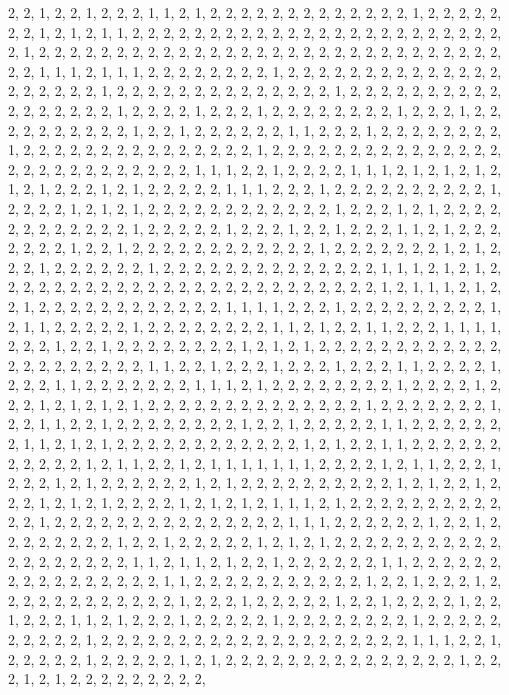 \documentclass[
]{article}
\begin{document}
\begin{Schunk}
\begin{Soutput}
2, 2, 1, 2, 2, 1, 2, 2, 2, 1, 1, 2, 1, 2, 2, 2, 2, 2, 2, 2, 2, 2, 2, 2, 2, 2, 1, 2, 2, 2, 2, 2, 2, 2, 1, 2, 1, 2, 1, 1, 2, 2, 2, 2, 2, 2, 2, 2, 2, 2, 2, 2, 2, 2, 2, 2, 2, 2, 2, 2, 2, 2, 2, 2, 2, 1, 2, 2, 2, 2, 2, 2, 2, 2, 2, 2, 2, 2, 2, 2, 2, 2, 2, 2, 2, 2, 2, 2, 2, 2, 2, 2, 2, 2, 2, 2, 2, 2, 1, 1, 1, 2, 1, 1, 1, 2, 2, 2, 2, 2, 2, 2, 2, 1, 2, 2, 2, 2, 2, 2, 2, 2, 2, 2, 2, 2, 2, 2, 2, 2, 2, 2, 2, 2, 1, 2, 2, 2, 2, 2, 2, 2, 2, 2, 2, 2, 2, 2, 2, 1, 2, 2, 2, 2, 2, 2, 2, 2, 2, 2, 2, 2, 2, 2, 2, 2, 2, 1, 2, 2, 2, 2, 1, 2, 2, 2, 1, 2, 2, 2, 2, 2, 2, 2, 2, 1, 2, 2, 2, 1, 2, 2, 2, 2, 2, 2, 2, 2, 2, 2, 1, 2, 2, 1, 2, 2, 2, 2, 2, 2, 1, 1, 2, 2, 2, 1, 2, 2, 2, 2, 2, 2, 2, 2, 1, 2, 2, 2, 2, 2, 2, 2, 2, 2, 2, 2, 2, 2, 2, 2, 1, 2, 2, 2, 2, 2, 2, 2, 2, 2, 2, 2, 2, 2, 2, 2, 2, 2, 2, 2, 2, 2, 2, 2, 2, 2, 2, 2, 1, 1, 1, 2, 2, 1, 2, 2, 2, 2, 1, 1, 1, 2, 1, 2, 1, 2, 1, 2, 1, 2, 1, 2, 2, 2, 1, 2, 1, 2, 2, 2, 2, 2, 1, 1, 1, 2, 2, 2, 1, 2, 2, 2, 2, 2, 2, 2, 2, 2, 2, 1, 2, 2, 2, 2, 1, 2, 1, 2, 1, 2, 2, 2, 2, 2, 2, 2, 2, 2, 2, 2, 2, 1, 2, 2, 2, 1, 2, 1, 2, 2, 2, 2, 2, 2, 2, 2, 2, 2, 2, 2, 1, 2, 2, 2, 2, 2, 1, 2, 2, 2, 1, 2, 2, 1, 2, 2, 2, 1, 1, 2, 1, 2, 2, 2, 2, 2, 2, 2, 1, 2, 2, 1, 2, 2, 2, 2, 2, 2, 2, 2, 2, 2, 2, 2, 1, 2, 2, 2, 2, 2, 2, 2, 1, 2, 1, 2, 2, 2, 1, 2, 2, 2, 2, 2, 2, 1, 2, 2, 2, 2, 2, 2, 2, 2, 2, 2, 2, 2, 2, 2, 1, 1, 1, 2, 1, 2, 1, 2, 2, 2, 2, 2, 2, 2, 2, 2, 2, 2, 2, 2, 2, 2, 2, 2, 2, 2, 2, 2, 2, 2, 2, 2, 1, 2, 1, 1, 1, 2, 1, 2, 2, 1, 2, 2, 2, 2, 2, 2, 2, 2, 2, 2, 2, 2, 1, 1, 1, 1, 2, 2, 2, 1, 2, 2, 2, 2, 2, 2, 2, 2, 2, 1, 2, 1, 1, 2, 2, 2, 2, 2, 1, 2, 2, 2, 2, 2, 2, 2, 2, 1, 1, 2, 1, 2, 2, 1, 1, 2, 2, 2, 1, 1, 1, 1, 2, 2, 2, 1, 2, 2, 1, 2, 2, 2, 2, 2, 2, 2, 2, 1, 2, 1, 2, 1, 2, 2, 2, 2, 2, 2, 2, 2, 2, 2, 2, 2, 2, 2, 2, 2, 2, 2, 2, 2, 2, 1, 1, 2, 2, 1, 2, 2, 2, 1, 2, 2, 2, 1, 2, 2, 2, 1, 1, 2, 2, 2, 2, 1, 2, 2, 2, 1, 1, 2, 2, 2, 2, 2, 2, 2, 1, 1, 1, 2, 1, 2, 2, 2, 2, 2, 2, 2, 2, 1, 2, 2, 2, 2, 1, 2, 2, 2, 1, 2, 1, 2, 1, 2, 1, 2, 2, 2, 2, 2, 2, 2, 2, 2, 2, 2, 2, 2, 2, 1, 2, 2, 2, 2, 2, 2, 2, 1, 2, 2, 1, 1, 2, 2, 1, 2, 2, 2, 2, 2, 2, 2, 2, 1, 2, 2, 1, 2, 2, 2, 2, 2, 1, 1, 2, 2, 2, 2, 2, 2, 2, 1, 1, 2, 1, 2, 1, 2, 2, 2, 2, 2, 2, 2, 2, 2, 2, 2, 2, 1, 2, 1, 2, 2, 1, 1, 2, 2, 2, 2, 2, 2, 2, 2, 2, 2, 2, 1, 2, 1, 1, 2, 2, 1, 2, 1, 1, 1, 1, 1, 1, 1, 2, 2, 2, 2, 1, 2, 1, 1, 2, 2, 2, 1, 2, 2, 2, 1, 2, 1, 2, 2, 2, 2, 2, 2, 1, 2, 1, 2, 2, 2, 2, 2, 2, 2, 2, 2, 2, 1, 2, 1, 2, 2, 1, 2, 2, 2, 1, 2, 1, 2, 1, 2, 2, 2, 2, 1, 2, 1, 2, 1, 2, 1, 1, 1, 2, 1, 2, 2, 2, 2, 2, 2, 2, 2, 2, 2, 2, 2, 1, 2, 2, 2, 2, 2, 2, 2, 2, 2, 2, 2, 2, 2, 2, 2, 1, 1, 1, 2, 2, 2, 2, 2, 2, 1, 2, 2, 1, 2, 2, 2, 2, 2, 2, 2, 2, 1, 2, 2, 1, 2, 2, 2, 2, 2, 1, 2, 1, 2, 1, 2, 2, 2, 2, 2, 2, 2, 2, 2, 2, 2, 2, 2, 2, 2, 2, 2, 2, 2, 1, 1, 2, 1, 1, 2, 1, 2, 2, 1, 2, 2, 2, 2, 2, 2, 1, 1, 2, 2, 2, 2, 2, 2, 2, 2, 2, 2, 2, 2, 2, 2, 2, 2, 1, 1, 2, 2, 2, 2, 2, 2, 2, 2, 2, 2, 2, 1, 2, 2, 1, 2, 2, 2, 1, 2, 2, 2, 2, 2, 2, 2, 2, 2, 2, 2, 2, 1, 2, 2, 2, 1, 2, 2, 2, 2, 2, 1, 2, 2, 1, 2, 2, 2, 2, 1, 2, 2, 1, 2, 2, 2, 1, 1, 2, 1, 2, 2, 2, 1, 2, 2, 2, 2, 2, 1, 2, 2, 2, 2, 2, 2, 2, 2, 1, 2, 2, 2, 2, 2, 2, 2, 2, 2, 2, 1, 2, 2, 2, 2, 2, 2, 2, 2, 2, 2, 2, 2, 2, 2, 2, 2, 2, 2, 2, 2, 1, 1, 1, 2, 2, 1, 2, 2, 2, 2, 2, 1, 2, 2, 2, 2, 2, 1, 2, 1, 2, 2, 2, 2, 2, 2, 2, 2, 2, 2, 2, 2, 2, 2, 2, 1, 2, 2, 2, 1, 2, 1, 2, 2, 2, 2, 2, 2, 2, 2, 2, 
\end{Soutput}
\end{Schunk}
\end{document}
